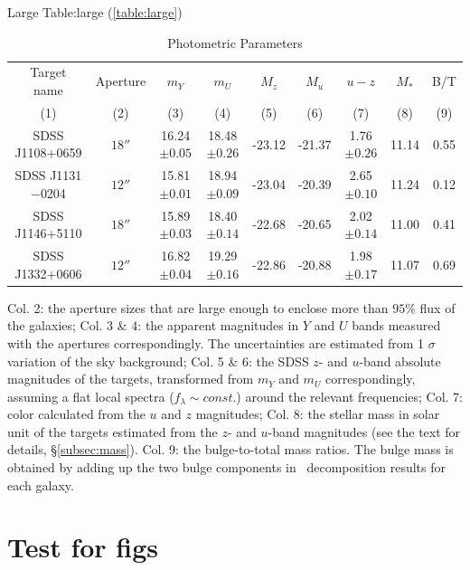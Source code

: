 Large Table:large (\autoref{table:large})


\begin{table}
\caption{Photometric Parameters}
\begin{center}
\begin{tabular}{c c c c c c c c c}
  \hline
  \hline
  Target name     & Aperture & $m_Y$           & $m_U$           & $M_z$  & $M_u$  & $u-z$          & $M_*$ & B/T  \\ 
      (1)         &    (2)   &  (3)            &  (4)            &   (5)  &   (6)  &  (7)           &  (8)  & (9)  \\ \hline
SDSS J1108+0659   & $18''$   & 16.24$\pm 0.05$ & 18.48$\pm 0.26$ & -23.12 & -21.37 & 1.76$\pm 0.26$ & 11.14 & 0.55 \\
SDSS J1131$-$0204 & $12''$   & 15.81$\pm 0.01$ & 18.94$\pm 0.09$ & -23.04 & -20.39 & 2.65$\pm 0.10$ & 11.24 & 0.12 \\
SDSS J1146+5110   & $18''$   & 15.89$\pm 0.03$ & 18.40$\pm 0.14$ & -22.68 & -20.65 & 2.02$\pm 0.14$ & 11.00 & 0.41 \\
SDSS J1332+0606   & $12''$   & 16.82$\pm 0.04$ & 19.29$\pm 0.16$ & -22.86 & -20.88 & 1.98$\pm 0.17$ & 11.07 & 0.69 \\ \hline
\end{tabular}
Col. 2: the aperture sizes that are large enough to enclose more than $95\%$ flux of the galaxies; 
Col. 3 \& 4: the apparent magnitudes in $Y$ and $U$ bands measured with the apertures correspondingly. 
The uncertainties are estimated from 1 $\sigma$ variation of the sky background; 
Col. 5 \& 6: the SDSS $z$- and $u$-band absolute magnitudes of the targets, transformed from $m_Y$ and $m_U$ correspondingly, assuming a flat local spectra ($f_{\lambda} \sim const.$) around the relevant frequencies; 
Col. 7: color calculated from the $u$ and $z$ magnitudes; 
Col. 8: the stellar mass in solar unit of the targets estimated from the $z$- and $u$-band magnitudes (see the text for details, \S \ref{subsec:mass}). 
Col. 9: the bulge-to-total mass ratios. 
The bulge mass is obtained by adding up the two bulge components in \galfit\ decomposition results for each galaxy.                                                         
\end{center}

\label{table:large}
\end{table}%

\newsinglepage

\section{Test for figs}
\label{testforfigs}


